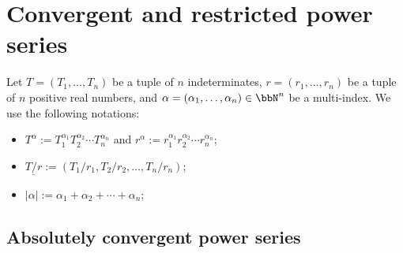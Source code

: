 \section{Convergent and restricted power series}


     \begin{notation}\label{notation:mult-label_for_Tate_algebra}
        Let \(T = (T_1, \ldots, T_n)\) be a tuple of \(n\) indeterminates, \(r = (r_1, \ldots, r_n)\) be a tuple of \(n\) positive real numbers, and \(\alpha = (\alpha_1, \ldots, \alpha_n) \in \bbN^n\) be a multi-index.
        We use the following notations:
        \begin{itemize}
            \item \(T^\alpha := T_1^{\alpha_1} T_2^{\alpha_2} \cdots T_n^{\alpha_n}\) and \(r^\alpha := r_1^{\alpha_1} r_2^{\alpha_2} \cdots r_n^{\alpha_n}\);
            \item \(\underline{T/r} := (T_1/r_1, T_2/r_2, \ldots, T_n/r_n)\);
            \item \(|\alpha| := \alpha_1 + \alpha_2 + \cdots + \alpha_n\);
        \end{itemize}
    \end{notation}


\subsection{Absolutely convergent power series}

